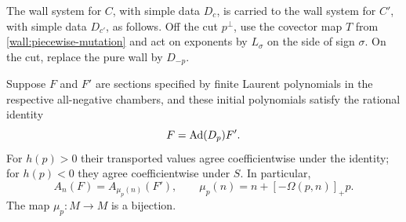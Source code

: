 \begin{theorem}
\label{wall:mutation}
The wall system for $C$, with simple data $D_c$, is carried
to the wall system for $C'$, with simple data $D_{c'}$, as
follows.  Off the cut $p^\perp$, use the covector map $T$
from \eqref{wall:piecewise-mutation} and act on exponents
by $L_\sigma$ on the side of sign $\sigma$.  On the cut,
replace the pure wall by $D_{-p}$.

Suppose $F$ and $F'$ are sections specified by finite Laurent
polynomials in the respective all-negative chambers, and
these initial polynomials satisfy the rational identity
\begin{equation}
 F=\operatorname{Ad}(D_p)F'.
 \label{wall:initial-comparison}
\end{equation}
For $h(p)>0$ their transported values agree coefficientwise
under the identity; for $h(p)<0$ they agree coefficientwise
under $S$.  In particular,
\begin{equation}
 A_n(F)=A_{\mu_p(n)}(F'),\qquad
 \mu_p(n)=n+[-\Omega(p,n)]_+p.
 \label{wall:incoming-mutation}
\end{equation}
The map $\mu_p:M\to M$ is a bijection.
\end{theorem}

